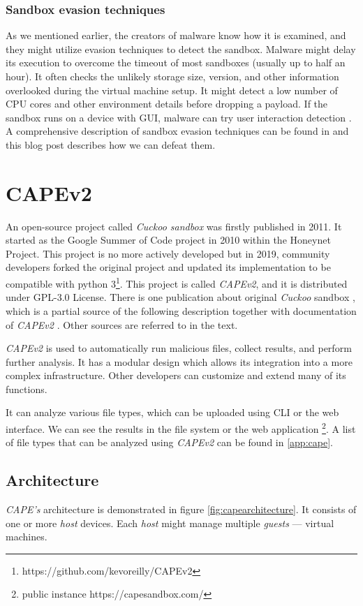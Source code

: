 \subsubsection*{Sandbox evasion techniques}
As we mentioned earlier, the creators of malware know how it is examined, and they might utilize evasion techniques to detect the sandbox. Malware might delay its execution to overcome the timeout of most sandboxes (usually up to half an hour). It often checks the unlikely storage size, version, and other information overlooked during the virtual machine setup. It might detect a low number of CPU cores and other environment details before dropping a payload. If the sandbox runs on a device with GUI, malware can try user interaction detection \cite{Evolutio45:online}. A comprehensive description of sandbox evasion techniques can be found in \cite{Afianian2018} and this blog post \cite{Chailytko2019} describes how we can defeat them.

\section{CAPEv2}
An open-source project called \emph{Cuckoo sandbox} was firstly published in 2011. It started as the Google Summer of Code project in 2010 within the Honeynet Project. This project is no more actively developed but in 2019, community developers forked the original project and updated its implementation to be compatible with python 3\footnote{https://github.com/kevoreilly/CAPEv2}. This project is called \emph{CAPEv2}, and it is distributed under GPL-3.0 License. There is one publication about original \emph{Cuckoo} sandbox \cite{Oktavianto2013}, which is a partial source of the following description together with documentation of \emph{CAPEv2} \cite{CAPESand75:online}. Other sources are referred to in the text.

\emph{CAPEv2} is used to automatically run malicious files, collect results, and perform further analysis. It has a modular design which allows its integration into a more complex infrastructure. Other developers can customize and extend many of its functions.

It can analyze various file types, which can be uploaded using CLI  or the web interface. We can see the results in the file system or the web application \footnote{public instance https://capesandbox.com/}. A list of file types that can be analyzed using \emph{CAPEv2} can be found in \ref{app:cape}.

\subsection{Architecture}
\emph{CAPE's} architecture is demonstrated in figure \ref{fig:capearchitecture}. It consists of one or more \emph{host} devices. Each \emph{host} might manage multiple \emph{guests} --- virtual machines. 

